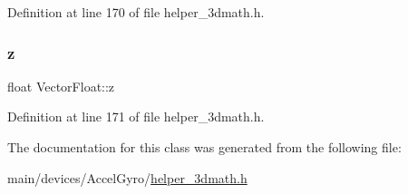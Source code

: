Definition at line 170 of file helper\+\_\+3dmath.\+h.

\mbox{\label{classVectorFloat_a54b8e4234e3b48e106d090570755f107}} 
\subsubsection{\texorpdfstring{z}{z}}
{\footnotesize\ttfamily float Vector\+Float\+::z}



Definition at line 171 of file helper\+\_\+3dmath.\+h.



The documentation for this class was generated from the following file\+:\begin{DoxyCompactItemize}
\item 
main/devices/\+Accel\+Gyro/\mbox{\hyperlink{helper__3dmath_8h}{helper\+\_\+3dmath.\+h}}\end{DoxyCompactItemize}
